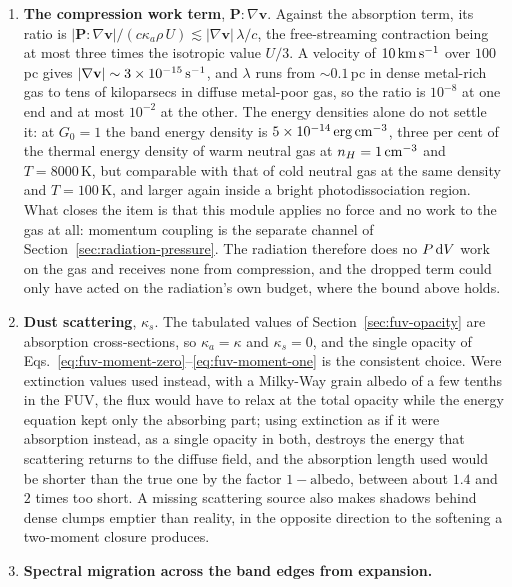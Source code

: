 \begin{enumerate}
    the only way to do better, and it is outside a two-moment grey
    scheme.
  \item \textbf{The compression work term}, $\mathbf P\!:\!\nabla\mathbf
    v$. Against the absorption term, its ratio is $|\mathbf
    P\!:\!\nabla\mathbf v|/(c\kappa_a\rho\,U)\lesssim
    |\nabla\mathbf v|\,\lambda/c$, the free-streaming contraction being at
    most three times the isotropic value $U/3$. A velocity of
    $10\,{\rm km\,s^{-1}}$ over $100$\,pc gives $|\nabla\mathbf v|\sim
    3\times10^{-15}\,{\rm s^{-1}}$, and $\lambda$ runs from $\sim0.1$\,pc
    in dense metal-rich gas to tens of kiloparsecs in diffuse metal-poor
    gas, so the ratio is $10^{-8}$ at one end and at most $10^{-2}$ at the
    other. The energy densities alone do not settle it: at $G_0 = 1$ the
    band energy density is $5\times10^{-14}\,{\rm erg\,cm^{-3}}$, three
    per cent of the thermal energy density of warm neutral gas at
    $n_H = 1\,{\rm cm^{-3}}$ and $T = 8000$\,K, but comparable with that
    of cold neutral gas at the same density and $T = 100$\,K, and larger
    again inside a bright photodissociation region. What closes the item
    is that this module applies no force and no work to the gas at all:
    momentum coupling is the separate channel of
    Section~\ref{sec:radiation-pressure}. The radiation therefore does no
    $P\,{\rm d}V$ work on the gas and receives none from compression, and
    the dropped term could only have acted on the radiation's own budget,
    where the bound above holds.
  \item \textbf{Dust scattering}, $\kappa_s$. The tabulated values of
    Section~\ref{sec:fuv-opacity} are absorption cross-sections, so
    $\kappa_a = \kappa$ and $\kappa_s = 0$, and the single opacity of
    Eqs.~\ref{eq:fuv-moment-zero}--\ref{eq:fuv-moment-one} is the
    consistent choice. Were extinction values used instead, with a
    Milky-Way grain albedo of a few tenths in the FUV, the flux would have
    to relax at the total opacity while the energy equation kept only the
    absorbing part; using extinction as if it were absorption instead, as
    a single opacity in both, destroys the energy that scattering returns
    to the diffuse field, and the absorption length used would be shorter
    than the true one by the factor $1-\text{albedo}$, between about
    $1.4$ and $2$ times too short.
    A missing scattering source also makes shadows behind dense clumps
    emptier than reality, in the opposite direction to the softening a
    two-moment closure produces.
  \item \textbf{Spectral migration across the band edges from expansion.}

\end{enumerate}
